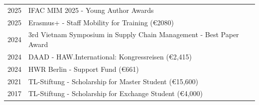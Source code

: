 
\begin{longtable}[l]{@{}p{} p{}}
    2025 & IFAC MIM 2025 - Young Author Awards \\
    
    2025 & Erasmus+ - Staff Mobility for Training (€2080) \\
    
    
    2024 & 3rd Vietnam Symposium in Supply Chain Management - Best Paper Award \\
   
    2024 & DAAD - HAW.International: Kongressreisen (€2,415) \\

    2024 & HWR Berlin - Support Fund (€661) \\

    2021 & TL-Stiftung - Scholarship for Master Student (€15,600) \\

    2017 & TL-Stiftung - Scholarship for Exchange Student (€4,000) \\


   
\end{longtable}
